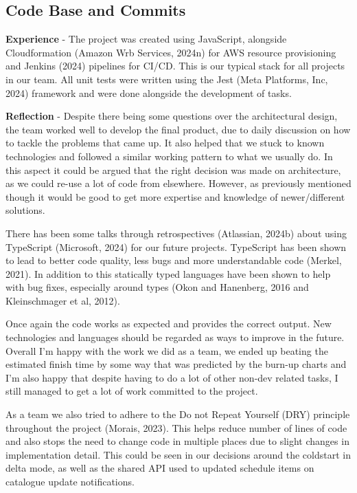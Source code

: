   \newpage
  \subsection{Code Base and Commits}

  \textbf{Experience} - The project was created using JavaScript, alongside Cloudformation (Amazon Wrb Services, 2024n) for AWS resource provisioning and 
  Jenkins (2024) pipelines for CI/CD. This is our typical stack for all projects in our team. All unit tests were written using the Jest 
  (Meta Platforms, Inc, 2024) framework and were done alongside the development of tasks.

  \vspace{0.2cm}
  \textbf{Reflection} - Despite there being some questions over the architectural design, the team worked well to develop the final product, due to daily 
  discussion on how to tackle the problems that came up. It also helped that we stuck to known technologies and followed a similar working pattern to what 
  we usually do. In this aspect it could be argued that the right decision was made on architecture, as we could re-use a lot of code from elsewhere.
  However, as previously mentioned though it would be good to get more expertise and knowledge of newer/different solutions.

  There has been some talks through retrospectives (Atlassian, 2024b) about using TypeScript (Microsoft, 2024) for our future projects. TypeScript has been 
  shown to lead to better code quality, less bugs and more understandable code (Merkel, 2021). In addition to this statically typed languages have been shown
  to help with bug fixes, especially around types (Okon and Hanenberg, 2016 and Kleinschmager et al, 2012).

  Once again the code works as expected and provides the correct output. New technologies and languages should be regarded as ways to improve in the future.
  Overall I'm happy with the work we did as a team, we ended up beating the estimated finish time by some way that was predicted by the burn-up charts and 
  I'm also happy that despite having to do a lot of other non-dev related tasks, I still managed to get a lot of work committed to the project.

  As a team we also tried to adhere to the Do not Repeat Yourself (DRY) principle throughout the project (Morais, 2023). This helps reduce number of lines of 
  code and  also stops the need to change code in multiple places due to slight changes in implementation detail. This could be seen in our decisions around the 
  coldstart in delta mode, as well as the shared API used to updated schedule items on catalogue update notifications.


